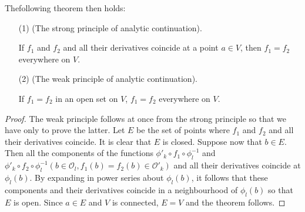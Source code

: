 The\pageoriginale following theorem then holds:

\begin{theorem*}
\begin{itemize}
\item[\rm (1)] (The strong principle of analytic continuation). 

If $f_1$ and $f_2$ and all their derivatives coincide at a point $a\in
V$, then $f_1 = f_2$ everywhere on $V$. 

\item[{\rm (2)}] (The weak principle of analytic continuation). 

If $f_1 = f_2$ in an open set on $V$, $f_1 = f_2$ everywhere on $V$. 
\end{itemize}
\end{theorem*}

\begin{proof}
The weak principle follows at once from the strong principle so that
we have only to prove the latter. Let $E$ be the set of points where
$f_1$ and $f_2$ and all their derivatives coincide. It is clear that
$E$ is closed. Suppose now that $b \in E$. Then all the components of
the functions $\phi'_k \circ f_1 \circ \phi^{-1}_l$ and $\phi'_k \circ
f_2 \circ \phi^{-1}_l (b \in\mathscr{O}_l, f_1(b) = f_2 (b) \in
\mathscr{O}'_k)$ and all their derivatives coincide at $\phi_l(b)$. By
expanding in power series about $\phi_l(b)$, it follows that these
components and their derivatives coincide in a neighbourhood of
$\phi_l(b)$ so that $E$ is open. Since $a \in E$ and $V$ is connected,
$E=V$ and the theorem follows.
\end{proof}
